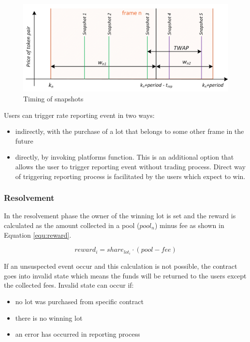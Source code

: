 \documentclass{article}
\begin{document}
	\begin{figure}[h]
		\centering
		\includegraphics[scale=1]{images/reportingTWAP.png}
		\caption{Timing of snapshots}
		\label{fig:reportingTwap}
	\end{figure}
	
	Users can trigger rate reporting event in two ways:
	
	\begin{itemize}
		\item indirectly, with the purchase of a lot that belongs to some other frame in the future
		\item directly, by invoking platforms function. This is an additional option that allows the user to trigger reporting event without trading process. Direct way of triggering reporting process is facilitated by the users which expect to win. 
	\end{itemize}
	
	
	\subsubsection{Resolvement}\label{sec:resolvement}
	
	In the resolvement phase the owner of the winning lot is set and the reward is calculated as the amount collected in a pool ($pool_n$) minus fee as shown in Equation \ref{equ:reward}.
	
	\begin{equation}
		\label{equ:reward}
		reward_i=share_{lot_i} \cdot (pool-fee)
	\end{equation}
	
	If an unsuspected event occur and this calculation is not possible, the contract goes into invalid state which means the funds will be returned to the users except the collected fees. Invalid state can occur if:
	
	\begin{itemize}
		\item no lot was purchased from specific contract
		\item there is no winning lot
		\item an error has occurred in reporting process
	\end{itemize}
	
\end{document}
